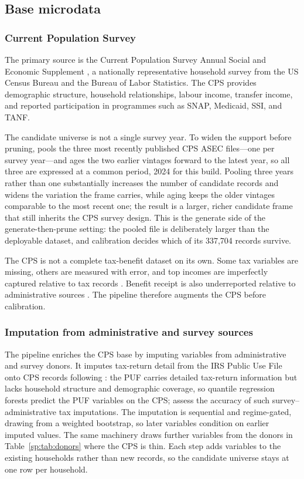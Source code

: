 \subsection{Base microdata}

\subsubsection{Current Population Survey}

The primary source is the Current Population Survey Annual Social and Economic Supplement
\citep[CPS ASEC;][]{census2024}, a nationally representative household survey from the US Census
Bureau and the Bureau of Labor Statistics. The CPS provides demographic structure, household
relationships, labour income, transfer income, and reported participation in programmes such as
SNAP, Medicaid, SSI, and TANF.

The candidate universe is not a single survey year. To widen the support before pruning, \populace{}
pools the three most recently published CPS ASEC files---one per survey year---and ages the two earlier
vintages forward to the latest year, so all three are expressed at a common period, 2024 for this build.
Pooling three years rather than one substantially increases the number of candidate records and widens the
variation the frame carries, while aging keeps the older vintages comparable to the most recent one; the result is a
larger, richer candidate frame that still inherits the CPS survey design. This is the generate side of the
generate-then-prune setting: the pooled file is deliberately larger than the deployable dataset, and
calibration decides which of its 337{,}704 records survive.

The CPS is not a complete tax-benefit dataset on its own. Some tax variables are missing, others are
measured with error, and top incomes are imperfectly captured relative to tax records
\citep{burkhauser2012}. Benefit receipt is also underreported relative to administrative sources
\citep{meyer2015}. The pipeline therefore augments the CPS before calibration.

\subsubsection{Imputation from administrative and survey sources}

The pipeline enriches the CPS base by imputing variables from administrative and survey donors. It
imputes tax-return detail from the IRS Public Use File \citep[PUF;][]{bryant2023a} onto CPS records
following \citet{woodruff2024}: the PUF carries detailed tax-return information but lacks household
structure and demographic coverage, so quantile regression forests \citep{meinshausen2006quantile}
predict the PUF variables on the CPS; \citet{meyer2021} assess the accuracy of such
survey--administrative tax imputations. The imputation is sequential and regime-gated, drawing from a
weighted bootstrap, so later variables condition on earlier imputed values. The same machinery draws
further variables from the donors in Table~\ref{sp:tab:donors} where the CPS is thin. Each step adds
variables to the existing households rather than new records, so the candidate universe stays at one
row per household.

